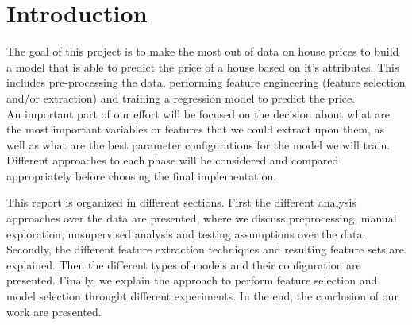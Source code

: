 
\section{Introduction}

The goal of this project is to make the most out of data on house prices to build a model that is able to predict the price of a house based on it's attributes.
This includes pre-processing the data, performing feature engineering (feature selection and/or extraction) and training a regression model to predict the price. \\
An important part of our effort will be focused on the decision about what are the most important variables or features that we could extract upon them, as well as what are the best parameter configurations for the model we will train. Different approaches to each phase will be considered and compared appropriately before choosing the final implementation.

This report is organized in different sections. First the different analysis approaches over the data are presented, where we discuss preprocessing, manual exploration, unsupervised analysis and testing assumptions over the data. Secondly, the different feature extraction techniques and resulting feature sets are explained. Then the different types of models and their configuration are presented. Finally, we explain the approach to perform feature selection and model selection throught different experiments. In the end, the conclusion of our work are presented.
